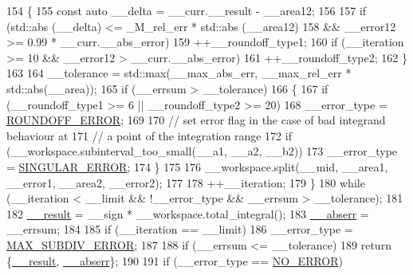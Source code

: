 \begin{DoxyCode}
154             \{
155               \textcolor{keyword}{const} \textcolor{keyword}{auto} \_\_delta = \_\_curr.\_\_result - \_\_area12;
156 
157               \textcolor{keywordflow}{if} (std::abs (\_\_delta) <= \_M\_rel\_err * std::abs (\_\_area12)
158                    && \_\_error12 >= 0.99 * \_\_curr.\_\_abs\_error)
159                 ++\_\_roundoff\_type1;
160               \textcolor{keywordflow}{if} (\_\_iteration >= 10 && \_\_error12 > \_\_curr.\_\_abs\_error)
161                 ++\_\_roundoff\_type2;
162             \}
163 
164           \_\_tolerance = std::max(\_\_max\_abs\_err, \_\_max\_rel\_err * std::abs(\_\_area));
165           \textcolor{keywordflow}{if} (\_\_errsum > \_\_tolerance)
166             \{
167               \textcolor{keywordflow}{if} (\_\_roundoff\_type1 >= 6 || \_\_roundoff\_type2 >= 20)
168                 \_\_error\_type = \hyperlink{namespace____gnu__cxx_ad6c62dd86a596716cece6ac2d4cfd4b3a29574de87143c7715e9a138d7340e8ae}{ROUNDOFF\_ERROR};
169 
170               \textcolor{comment}{// set error flag in the case of bad integrand behaviour at}
171               \textcolor{comment}{// a point of the integration range}
172               \textcolor{keywordflow}{if} (\_\_workspace.subinterval\_too\_small(\_\_a1, \_\_a2, \_\_b2))
173                 \_\_error\_type = \hyperlink{namespace____gnu__cxx_ad6c62dd86a596716cece6ac2d4cfd4b3a8e955ea89d59c116d92f16f345620d04}{SINGULAR\_ERROR};
174             \}
175 
176           \_\_workspace.split(\_\_mid, \_\_area1, \_\_error1, \_\_area2, \_\_error2);
177 
178           ++\_\_iteration;
179         \}
180       \textcolor{keywordflow}{while} (\_\_iteration < \_\_limit && !\_\_error\_type && \_\_errsum > \_\_tolerance);
181 
182       \hyperlink{namespace____gnu__cxx_a500ea9f53aeaecd8c2ae657503450578}{\_\_result} = \_\_sign * \_\_workspace.total\_integral();
183       \hyperlink{namespace____gnu__cxx_a72f736cff127f1574e91a301de9e074b}{\_\_abserr} = \_\_errsum;
184 
185       \textcolor{keywordflow}{if} (\_\_iteration == \_\_limit)
186         \_\_error\_type = \hyperlink{namespace____gnu__cxx_ad6c62dd86a596716cece6ac2d4cfd4b3a4c1e6a4f8a49af2eae50e4bf6f93e016}{MAX\_SUBDIV\_ERROR};
187 
188       \textcolor{keywordflow}{if} (\_\_errsum <= \_\_tolerance)
189         \textcolor{keywordflow}{return} \{\hyperlink{namespace____gnu__cxx_a500ea9f53aeaecd8c2ae657503450578}{\_\_result}, \hyperlink{namespace____gnu__cxx_a72f736cff127f1574e91a301de9e074b}{\_\_abserr}\};
190 
191       \textcolor{keywordflow}{if} (\_\_error\_type == \hyperlink{namespace____gnu__cxx_ad6c62dd86a596716cece6ac2d4cfd4b3ac31eecc280b10dec2efb4a2216ccc2e0}{NO\_ERROR})

\end{DoxyCode}
